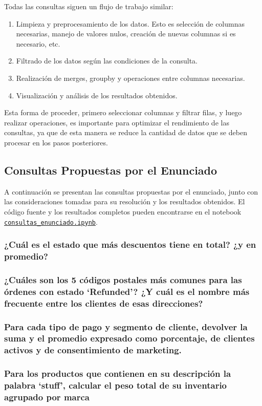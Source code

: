 Todas las consultas siguen un flujo de trabajo similar:
\begin{enumerate}
    \item Limpieza y preprocesamiento de los datos. Esto es selección de columnas necesarias, manejo de valores nulos, creación de nuevas columnas si es necesario, etc.
    \item Filtrado de los datos según las condiciones de la consulta.
    \item Realización de merges, groupby y operaciones entre columnas necesarias.
    \item Visualización y análisis de los resultados obtenidos.
\end{enumerate}
Esta forma de proceder, primero seleccionar columnas y filtrar filas, y luego realizar operaciones, es importante para optimizar el rendimiento de las consultas, ya que de esta manera se reduce la cantidad de datos que se deben procesar en los pasos posteriores.

\subsection{Consultas Propuestas por el Enunciado}

A continuación se presentan las consultas propuestas por el enunciado, junto con las consideraciones tomadas para su resolución y los resultados obtenidos. El código fuente y los resultados completos pueden encontrarse en el notebook \href{https://github.com/patricioibar/datos-tp1/blob/main/consultas_enunciado.ipynb}{\texttt{consultas\_enunciado.ipynb}}.

\subsubsection{¿Cuál es el estado que más descuentos tiene en total? ¿y en promedio?}


\subsubsection{¿Cuáles son los 5 códigos postales más comunes para las órdenes con estado `Refunded'? ¿Y cuál es el nombre más frecuente entre los clientes de esas direcciones?}


\subsubsection{Para cada tipo de pago y segmento de cliente, devolver la suma y el promedio expresado como porcentaje, de clientes activos y de consentimiento de marketing.}


\subsubsection{Para los productos que contienen en su descripción la palabra `stuff', calcular el peso total de su inventario agrupado por marca}
